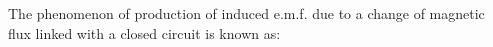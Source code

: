 The phenomenon of production of induced e.m.f. due to a change of magnetic flux linked with a closed circuit is known as: